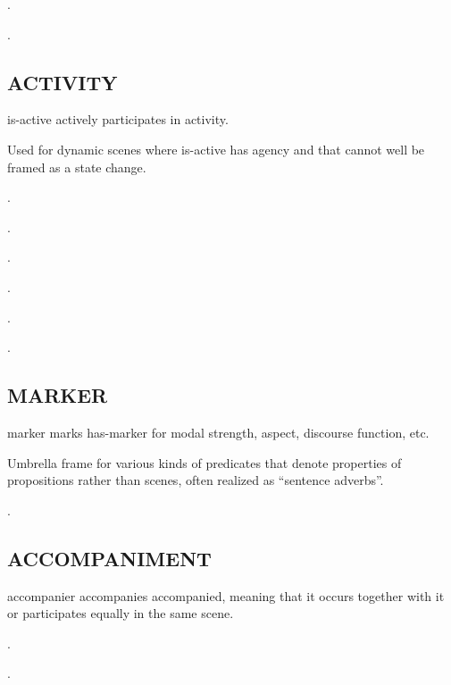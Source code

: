 \documentclass[a4paper]{article}
\newcommand{\fr}[1]{\textsf{#1}}
\newcommand{\rl}[1]{\textsf{#1}}
\begin{document}
\ex.

\ex.

\subsection{\fr{ACTIVITY}}
\label{sec:ACTIVITY}

\rl{is-active} actively participates in \rl{activity}.

Used for dynamic scenes where \rl{is-active} has agency and that cannot well be
framed as a state change.

\ex.

\ex.

\ex.

\ex.

\ex.

\ex.

\subsection{\fr{MARKER}}
\label{sec:MARKER}

\rl{marker} marks \rl{has-marker} for modal strength, aspect, discourse function, etc.

Umbrella frame for various kinds of predicates that denote properties of propositions rather than scenes, often realized as ``sentence adverbs''.

\ex.

\subsection{\fr{ACCOMPANIMENT}}
\label{sec:ACCOMPANIMENT}

\rl{accompanier} accompanies \rl{accompanied}, meaning that it occurs together
with it or participates equally in the same scene.

\ex.

\ex.
\end{document}
